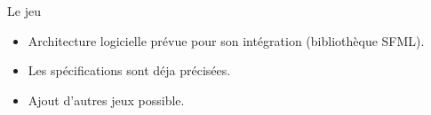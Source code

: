 \begin{frame}{Le jeu}
  \begin{itemize}
    \item Architecture logicielle prévue pour son intégration (bibliothèque SFML).
    \item Les spécifications sont déja précisées.
    \item Ajout d'autres jeux possible.
  \end{itemize}
\end{frame}
